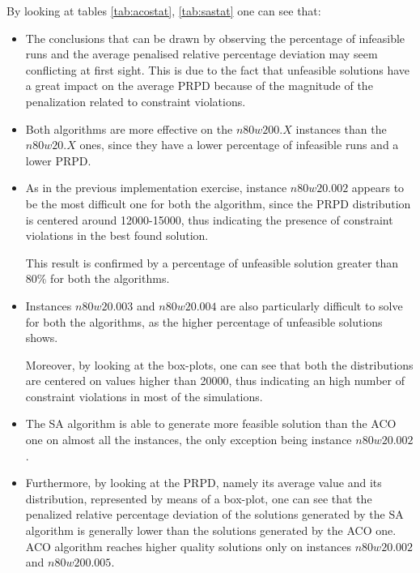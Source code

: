 By looking at tables \ref{tab:acostat}, \ref{tab:sastat} one can see that:
\begin{itemize}

\item The conclusions that can be drawn by observing the percentage of infeasible runs and the average penalised relative percentage deviation may seem conflicting at first sight. 
This is due to the fact that unfeasible solutions have a great impact on the average PRPD because of the magnitude of the penalization related to constraint violations.

\item Both algorithms are more effective on the $n80w200.X$ instances than the $n80w20.X$ ones, since they have a lower percentage of infeasible runs and a lower PRPD.

\item As in the previous implementation exercise, instance $n80w20.002$ appears to be the most difficult one for both the algorithm, since the PRPD distribution is centered around 12000-15000, thus indicating the presence of constraint violations in the best found solution.

This result is confirmed by a percentage of unfeasible solution greater than 80\% for both the algorithms.

\item Instances $n80w20.003$ and $n80w20.004$ are also particularly difficult to solve for both the algorithms, as the higher percentage of unfeasible solutions shows.

Moreover, by looking at the box-plots, one can see that both the distributions are centered on values higher than 20000, thus indicating an high number of constraint violations in most of the simulations.


\item The SA algorithm is able to generate more feasible solution than the ACO one on almost all the instances, the only exception being instance $n80w20.002$.

\item Furthermore, by looking at the PRPD, namely its average value and its distribution, represented by means of a box-plot, one can see that the penalized relative percentage deviation of the solutions generated by the SA algorithm is generally lower than the solutions generated by the ACO one.
ACO algorithm reaches higher quality solutions only on instances $n80w20.002$ and $n80w200.005$.



\end{itemize}
